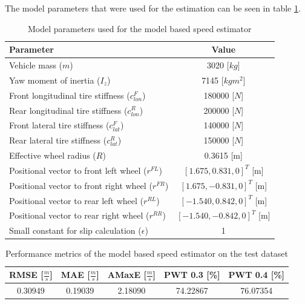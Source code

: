 The model parameters that were used for the estimation can be seen in table \ref{tab:model_based_params}.
\begin{table}[h]
    \centering
    \begin{tabular}{|l|c|}
        \hline
        \textbf{Parameter} & \textbf{Value} \\
        \hline \hline
        Vehicle mass ($m$) & 3020 [$kg$] \\ \hline
        Yaw moment of inertia ($I_z$) & 7145 [$kg m^2$] \\ \hline
        Front longitudinal tire stiffness ($c_{lon}^F$) & 180000 [$N$] \\ \hline
        Rear longitudinal tire stiffness ($c_{lon}^R$) & 200000 [$N$] \\ \hline
        Front lateral tire stiffness ($c_{lat}^F$) & 140000 [$N$] \\ \hline
        Rear lateral tire stiffness ($c_{lat}^R$) & 150000 [$N$] \\ \hline
        Effective wheel radius ($R$) & 0.3615 [m] \\ \hline
        Positional vector to front left wheel ($r^{FL}$) & $[1.675, 0.831, 0]^T$ [m] \\ \hline
        Positional vector to front right wheel ($r^{FR}$) & $[1.675, -0.831, 0]^T$ [m] \\ \hline
        Positional vector to rear left wheel ($r^{RL}$) & $[-1.540, 0.842, 0]^T$ [m] \\ \hline
        Positional vector to rear right wheel ($r^{RR}$) & $[-1.540, -0.842, 0]^T$ [m] \\ \hline
        Small constant for slip calculation ($\epsilon$) & 1 \\
        \hline
    \end{tabular}
    \caption{Model parameters used for the model based speed estimator}
    \label{tab:model_based_params}
\end{table}

\FloatBarrier
\begin{table}[h]
    \centering
    \begin{tabular}{|c|c|c|c|c|}
        \hline
        \textbf{RMSE [$\frac{m}{s}$]} & \textbf{MAE [$\frac{m}{s}$]} & \textbf{AMaxE [$\frac{m}{s}$]} & \textbf{PWT 0.3 [\%]} & \textbf{PWT 0.4 [\%]} \\
        \hline \hline
        0.30949 & 0.19039 & 2.18090 & 74.22867 & 76.07354 \\
        \hline
    \end{tabular}
    \caption{Performance metrics of the model based speed estimator on the test dataset}
    \label{tab:model_based_estimator_results}
\end{table}
\FloatBarrier

